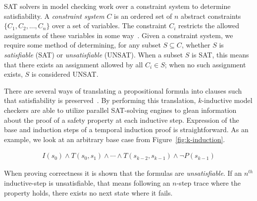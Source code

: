 SAT solvers in model checking work over a constraint system to determine satisfiability. A \textit{constraint system} $C$ is an ordered set of $n$ abstract constraints $\{C_1, C_2, ..., C_n\}$ over a set of variables. The constraint $C_i$ restricts the allowed assignments of these variables in some way~\cite{liffiton2016fast}. Given a constraint system, we require some method of determining, for any subset $S \subseteq C$, whether $S$ is \textit{satisfiable} (SAT) or \textit{unsatisfiable} (UNSAT). When a subset $S$ is SAT, this means that there exists an assignment allowed by all $C_i \in S$; when no such assignment exists, $S$ is considered UNSAT. 

There are several ways of translating a propositional formula into clauses such that satisfiability is preserved~\cite{een2003temporal}. By performing this translation, $k$-inductive model checkers are able to utilize parallel SAT-solving engines to glean information about the proof of a safety property at each inductive step. Expression of the base and induction steps of a temporal induction proof is straightforward. As an example, we look at an arbitrary base case from Figure~\ref{fig:k-induction}.

\begin{gather*}
I(s_0) \land T(s_0, s_1) \land \cdots \land T(s_{k-2}, s_{k-1})
\land \neg P(s_{k-1})
\end{gather*}

When proving correctness it is shown that the formulas are \emph{unsatisfiable}. If an $n^{th}$ inductive-step is unsatisfiable, that means following an $n$-step trace where the property holds, there exists no next state where it fails. 

